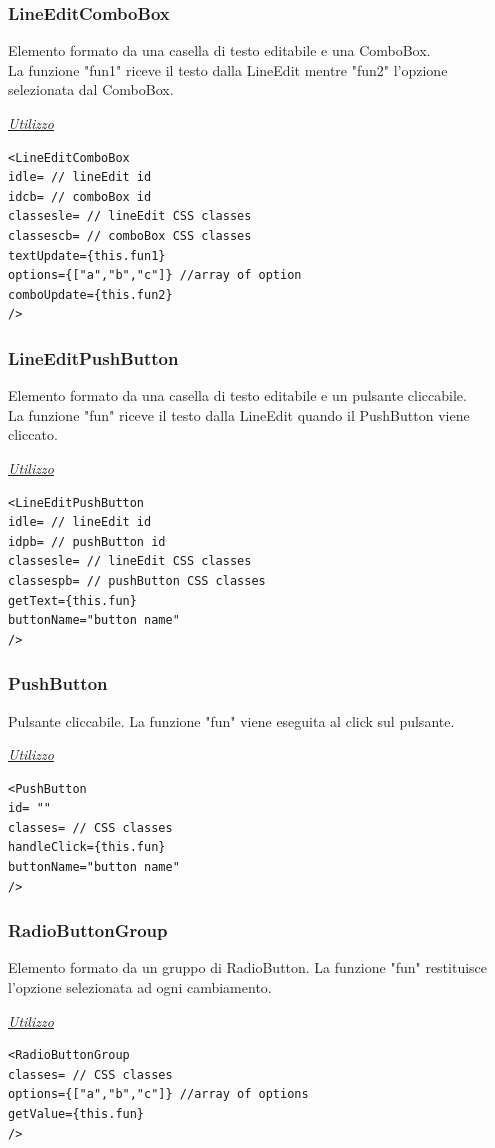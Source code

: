 \subsubsection{LineEditComboBox}
Elemento formato da una casella di testo editabile e una ComboBox.\\
La funzione "fun1" riceve il testo dalla LineEdit mentre "fun2" l'opzione selezionata dal ComboBox.
\begin{center}
\underline{\textit{Utilizzo}}
\begin{lstlisting}
<LineEditComboBox
idle= // lineEdit id
idcb= // comboBox id
classesle= // lineEdit CSS classes
classescb= // comboBox CSS classes
textUpdate={this.fun1}
options={["a","b","c"]} //array of option
comboUpdate={this.fun2}
/>
\end{lstlisting}
\end{center}

\subsubsection{LineEditPushButton}
Elemento formato da una casella di testo editabile e un pulsante cliccabile.\\
La funzione "fun" riceve il testo dalla LineEdit quando il PushButton viene cliccato.
\begin{center}
\underline{\textit{Utilizzo}}
\begin{lstlisting}
<LineEditPushButton
idle= // lineEdit id
idpb= // pushButton id
classesle= // lineEdit CSS classes
classespb= // pushButton CSS classes
getText={this.fun}
buttonName="button name"
/>
\end{lstlisting}
\end{center}

\subsubsection{PushButton}
Pulsante cliccabile. La funzione "fun" viene eseguita al click sul pulsante.
\begin{center}
\underline{\textit{Utilizzo}}
\begin{lstlisting}
<PushButton
id= ""
classes= // CSS classes
handleClick={this.fun}
buttonName="button name"
/>
\end{lstlisting}
\end{center}

\subsubsection{RadioButtonGroup}
Elemento formato da un gruppo di RadioButton. La funzione "fun" restituisce l'opzione selezionata ad ogni cambiamento.
\begin{center}
\underline{\textit{Utilizzo}}
\begin{lstlisting}
<RadioButtonGroup
classes= // CSS classes
options={["a","b","c"]} //array of options
getValue={this.fun}
/>
\end{lstlisting}
\end{center}

